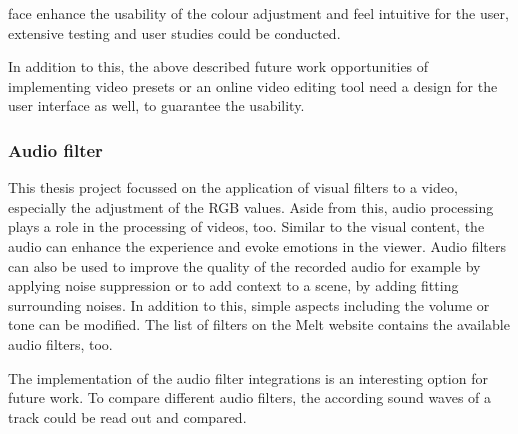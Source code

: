 \documentclass[../MasterThesis.tex]{subfiles}
\begin{document}
face enhance the usability of the colour adjustment and feel intuitive for the user, extensive testing and user studies could be conducted.




In addition to this, the above described future work opportunities of implementing video presets or an online video editing tool need a design for the user interface as well, to guarantee the usability. 






\subsubsection*{Audio filter}

This thesis project focussed on the application of visual filters to a video, especially the adjustment of the RGB values. Aside from this, audio processing plays a role in the processing of videos, too. Similar to the visual content, the audio can enhance the experience and evoke emotions in the viewer. Audio filters can also be used to improve the quality of the recorded audio for example by applying noise suppression or to add context to a scene, by adding fitting surrounding noises. In addition to this, simple aspects including the volume or tone can be modified.
The list of filters on the Melt website contains the available audio filters, too.~\cite{melt}

The implementation of the audio filter integrations is an interesting option for future work. To compare different audio filters, the according sound waves of a track could be read out and compared.









	
	
	
\end{document}
